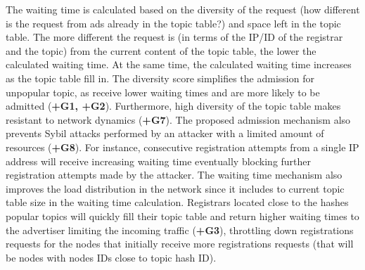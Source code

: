 The waiting time is calculated based on the diversity of the request (\ie how different is the request from ads already in the topic table?) and space left in the topic table. 
The more different the request is (in terms of the IP/ID of the registrar and the topic) from the current content of the topic table, the lower the calculated waiting time. 
At the same time,  the calculated waiting time increases as the topic table fill in. 
The diversity score simplifies the admission for unpopular topic, as receive lower waiting times and are more likely to be admitted (\textbf{+G1, +G2}).
Furthermore,  high diversity of the topic table makes \sysname resistant to network dynamics (\textbf{+G7}). The proposed admission mechanism also prevents Sybil attacks performed by an attacker with a limited amount of resources (\textbf{+G8}). 
For instance, consecutive registration attempts from a single IP address will receive increasing waiting time eventually blocking further registration attempts made by the attacker. 
The waiting time mechanism also improves the load distribution in the network since it includes to current topic table size in the waiting time calculation.
Registrars located close to the hashes popular topics will quickly fill their topic table and return higher waiting times to the advertiser limiting the incoming traffic (\textbf{+G3}),  throttling down registrations requests for the nodes that initially receive more registrations requests (that will be nodes with nodes IDs close to topic hash ID).